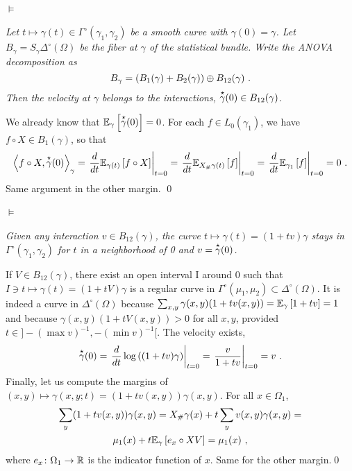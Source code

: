 \documentclass[runningheads]{llncs}
\begin{document}
\paragraph{$\bm\models$} \emph{Let $t \mapsto \gamma(t) \in \Gamma^\circ(\gamma_1,\gamma_2)$ be a smooth curve with $\gamma(0)=\gamma$. Let $B_\gamma = S_\gamma \Delta^\circ(\Omega)$ be the fiber at $\gamma$ of the statistical bundle. Write the ANOVA decomposition as
  \begin{equation*}
    B_{\gamma} = (B_1(\gamma) + B_2(\gamma)) \oplus B_{12}(\gamma) \ .
  \end{equation*}
  Then the velocity at $\gamma$ belongs to the interactions, $\overset{\star}{\gamma}(0) \in B_{12}(\gamma)$.}


We already know that ${\operatorname{\mathbb E}}_{\gamma}\left[\overset{\star}{\gamma}(0)\right] = 0$. For each $f \in L_0(\gamma_1)$, we have $f \circ X \in B_1(\gamma)$, so that 
%
    \begin{equation*}
    \left\langle f \circ X , \overset{\star}{\gamma}(0) \right\rangle_{\gamma} = \left. \frac{d}{dt} {\operatorname{\mathbb E}}_{\gamma(t)}\left[f \circ X\right] \right|_{t=0} = \left. \frac{d}{dt} {\operatorname{\mathbb E}}_{X_{\#}\gamma(t)}\left[f\right] \right|_{t=0} = \left. \frac{d}{dt} {\operatorname{\mathbb E}}_{\gamma_1}\left[f\right] \right|_{t=0} = 0 \ .
    \end{equation*}
%
Same argument in the other margin. \qed

\paragraph{$\bm\models$} \emph{Given any interaction $v \in B_{12}(\gamma)$, the curve $t \mapsto \gamma(t) = (1+tv)\gamma$ stays in $\Gamma^\circ(\gamma_1,\gamma_2)$ for $t$ in a neighborhood of 0 and $v = \overset{\star}{\gamma}(0)$.} 

If $V \in B_{12}(\gamma)$, there exist an open interval I around 0 such that $I \ni t \mapsto \gamma(t) = (1+tV)\gamma$ is a regular curve in $\Gamma^\circ(\mu_1,\mu_2) \subset \Delta^\circ(\Omega)$. It is indeed a curve in $\Delta^\circ(\Omega)$ because $\sum_{x,y} \gamma(x,y)(1+tv(x,y)) = {\operatorname{\mathbb E}}_{\gamma}\left[1+tv\right] = 1$ and because $\gamma(x,y)(1+tV(x,y)) > 0$ for all $x,y$, provided $t \in ]- (\max v)^{-1}, - (\min v)^{-1}[$.  The velocity exists,
%
\    \begin{equation*}
     \overset{\star}{\gamma}(0) = \left.  \frac{d}{dt} \log\left( (1+tv)\gamma \right) \right|_{t=0} = \left. \frac v {1+tv} \right|_{t=0} = v \ .
    \end{equation*}
%
Finally, let us compute the margins of $(x,y) \mapsto \gamma(x,y;t) = (1+tv(x,y))\gamma(x,y)$. For all $x \in \Omega_1$,
%
\begin{multline*}
  \sum_y (1+tv(x,y))\gamma(x,y) = X_\# \gamma(x) + t \sum_y v(x,y)\gamma(x,y) = \\ \mu_1(x) + t {\operatorname{\mathbb E}}_{\gamma}\left[e_x\circ X V\right] = \mu_1(x) \ ,
\end{multline*}
%
where $e_x \colon \Omega_1 \to \mathbb R$ is the indicator function of $x$. Same for the other margin.\qed
\end{document}
